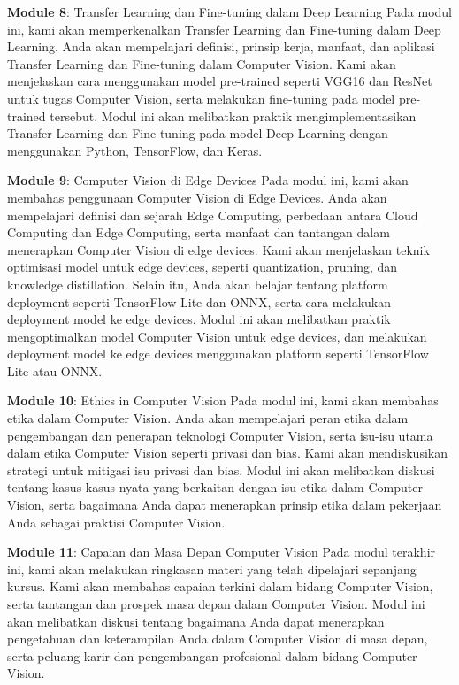 \documentclass[
  letterpaper,
  DIV=11,
  numbers=noendperiod]{scrreprt}
\begin{document}
\textbf{Module 8}: Transfer Learning dan Fine-tuning dalam Deep Learning
Pada modul ini, kami akan memperkenalkan Transfer Learning dan
Fine-tuning dalam Deep Learning. Anda akan mempelajari definisi, prinsip
kerja, manfaat, dan aplikasi Transfer Learning dan Fine-tuning dalam
Computer Vision. Kami akan menjelaskan cara menggunakan model
pre-trained seperti VGG16 dan ResNet untuk tugas Computer Vision, serta
melakukan fine-tuning pada model pre-trained tersebut. Modul ini akan
melibatkan praktik mengimplementasikan Transfer Learning dan Fine-tuning
pada model Deep Learning dengan menggunakan Python, TensorFlow, dan
Keras.

\textbf{Module 9}: Computer Vision di Edge Devices Pada modul ini, kami
akan membahas penggunaan Computer Vision di Edge Devices. Anda akan
mempelajari definisi dan sejarah Edge Computing, perbedaan antara Cloud
Computing dan Edge Computing, serta manfaat dan tantangan dalam
menerapkan Computer Vision di edge devices. Kami akan menjelaskan teknik
optimisasi model untuk edge devices, seperti quantization, pruning, dan
knowledge distillation. Selain itu, Anda akan belajar tentang platform
deployment seperti TensorFlow Lite dan ONNX, serta cara melakukan
deployment model ke edge devices. Modul ini akan melibatkan praktik
mengoptimalkan model Computer Vision untuk edge devices, dan melakukan
deployment model ke edge devices menggunakan platform seperti TensorFlow
Lite atau ONNX.

\textbf{Module 10}: Ethics in Computer Vision Pada modul ini, kami akan
membahas etika dalam Computer Vision. Anda akan mempelajari peran etika
dalam pengembangan dan penerapan teknologi Computer Vision, serta
isu-isu utama dalam etika Computer Vision seperti privasi dan bias. Kami
akan mendiskusikan strategi untuk mitigasi isu privasi dan bias. Modul
ini akan melibatkan diskusi tentang kasus-kasus nyata yang berkaitan
dengan isu etika dalam Computer Vision, serta bagaimana Anda dapat
menerapkan prinsip etika dalam pekerjaan Anda sebagai praktisi Computer
Vision.

\textbf{Module 11}: Capaian dan Masa Depan Computer Vision Pada modul
terakhir ini, kami akan melakukan ringkasan materi yang telah dipelajari
sepanjang kursus. Kami akan membahas capaian terkini dalam bidang
Computer Vision, serta tantangan dan prospek masa depan dalam Computer
Vision. Modul ini akan melibatkan diskusi tentang bagaimana Anda dapat
menerapkan pengetahuan dan keterampilan Anda dalam Computer Vision di
masa depan, serta peluang karir dan pengembangan profesional dalam
bidang Computer Vision.
\end{document}
